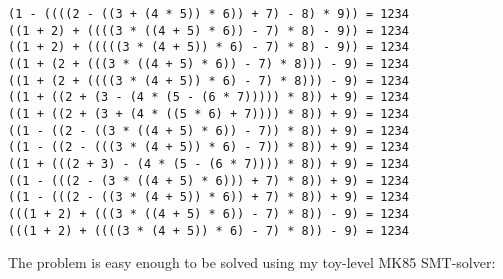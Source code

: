 \begin{lstlisting}
(1 - ((((2 - ((3 + (4 * 5)) * 6)) + 7) - 8) * 9)) = 1234
((1 + 2) + ((((3 * ((4 + 5) * 6)) - 7) * 8) - 9)) = 1234
((1 + 2) + (((((3 * (4 + 5)) * 6) - 7) * 8) - 9)) = 1234
((1 + (2 + (((3 * ((4 + 5) * 6)) - 7) * 8))) - 9) = 1234
((1 + (2 + ((((3 * (4 + 5)) * 6) - 7) * 8))) - 9) = 1234
((1 + ((2 + (3 - (4 * (5 - (6 * 7))))) * 8)) + 9) = 1234
((1 + ((2 + (3 + (4 * ((5 * 6) + 7)))) * 8)) + 9) = 1234
((1 - ((2 - ((3 * ((4 + 5) * 6)) - 7)) * 8)) + 9) = 1234
((1 - ((2 - (((3 * (4 + 5)) * 6) - 7)) * 8)) + 9) = 1234
((1 + (((2 + 3) - (4 * (5 - (6 * 7)))) * 8)) + 9) = 1234
((1 - (((2 - (3 * ((4 + 5) * 6))) + 7) * 8)) + 9) = 1234
((1 - (((2 - ((3 * (4 + 5)) * 6)) + 7) * 8)) + 9) = 1234
(((1 + 2) + (((3 * ((4 + 5) * 6)) - 7) * 8)) - 9) = 1234
(((1 + 2) + ((((3 * (4 + 5)) * 6) - 7) * 8)) - 9) = 1234
\end{lstlisting}

The problem is easy enough to be solved using my
toy-level MK85 SMT-solver:



